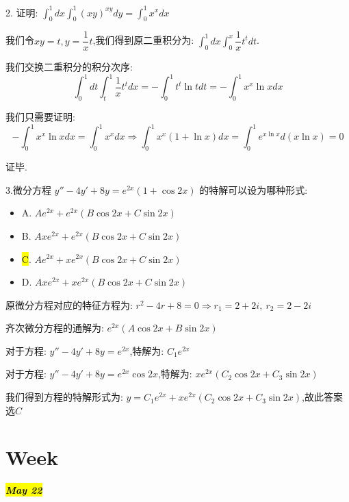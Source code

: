 2. 证明:  $\int_{0}^{1}dx\int_{0}^{1}(xy)^{xy}dy=\int_{0}^{1}x^{x}dx$
\begin{solution}
	
	我们令$xy=t,y=\dfrac{1}{x}t$,我们得到原二重积分为: $\int_{0}^{1}dx\int_{0}^{x}\dfrac{1}{x}t^{t}dt$.
	
	我们交换二重积分的积分次序: 
	$$\int_{0}^{1}dt\int_{t}^{1}\frac{1}{x}t^{t}dx=-\int_{0}^{1}t^{t}\ln tdt=-\int_{0}^{1}x^{x}\ln xdx$$
	
	我们只需要证明: 
	$$-\int_{0}^{1}x^{x}\ln xdx=\int_{0}^{1}x^{x}dx\Rightarrow\int_{0}^{1}x^{x}(1+\ln x)dx=\int_{0}^{1}e^{x\ln x}d(x\ln x)=0$$
	
	证毕.
\end{solution}
3.微分方程 $y''-4y'+8y=e^{2x}(1+\cos 2x)$ 的特解可以设为哪种形式: 
\begin{itemize}
	\item A. $Ae^{2x}+e^{2x}(B\cos 2x+C\sin 2x)$ 
	\item B. $Axe^{2x}+e^{2x}(B\cos 2x+C\sin 2x)$ 
	\item \hl{C}. $Ae^{2x}+xe^{2x}(B\cos 2x+C\sin 2x)$ 
	\item D. $Axe^{2x}+xe^{2x}(B\cos 2x+C\sin 2x)$ 
\end{itemize}
\begin{solution}
	
	原微分方程对应的特征方程为: $r^2-4r+8=0\Rightarrow r_{1}=2+2i,\ r_{2}=2-2i$
	
	齐次微分方程的通解为: $e^{2x}(A\cos 2x+B\sin 2x)$
	
	对于方程: $y''-4y'+8y=e^{2x}$,特解为: $C_{1}e^{2x}$
	
	对于方程: $y''-4y'+8y=e^{2x}\cos 2x$,特解为: $xe^{2x}(C_{2}\cos 2x+C_{3}\sin 2x)$
	
	我们得到方程的特解形式为: $y=C_{1}e^{2x}+xe^{2x}(C_{2}\cos 2x+C_{3}\sin 2x)$,故此答案选$C$
\end{solution}


\section{Week }
\hl{\textbf{\textit{May 22}}}

